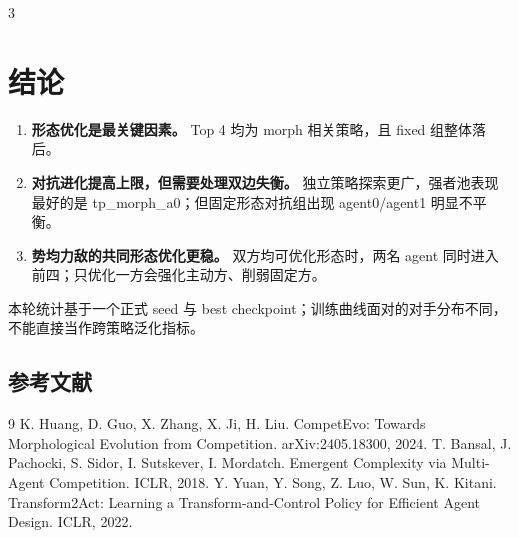 \documentclass[final]{beamer}
\newcommand{\agent}[1]{{\ttfamily\scriptsize #1}}
\begin{document}
\begin{frame}[t]
\begin{multicols}{3}
\section{结论}

\begin{enumerate}
  \item \textbf{形态优化是最关键因素。} Top 4 均为 morph 相关策略，且 fixed 组整体落后。
  \item \textbf{对抗进化提高上限，但需要处理双边失衡。} 独立策略探索更广，强者池表现最好的是 \agent{tp\_morph\_a0}；但固定形态对抗组出现 agent0/agent1 明显不平衡。
  \item \textbf{势均力敌的共同形态优化更稳。} 双方均可优化形态时，两名 agent 同时进入前四；只优化一方会强化主动方、削弱固定方。
\end{enumerate}

 本轮统计基于一个正式 seed 与 best checkpoint；训练曲线面对的对手分布不同，不能直接当作跨策略泛化指标。

\subsection{参考文献}
\begin{thebibliography}{9}
K. Huang, D. Guo, X. Zhang, X. Ji, H. Liu.
\newblock CompetEvo: Towards Morphological Evolution from Competition.
\newblock arXiv:2405.18300, 2024.
T. Bansal, J. Pachocki, S. Sidor, I. Sutskever, I. Mordatch.
\newblock Emergent Complexity via Multi-Agent Competition.
\newblock ICLR, 2018.
Y. Yuan, Y. Song, Z. Luo, W. Sun, K. Kitani.
\newblock Transform2Act: Learning a Transform-and-Control Policy for Efficient Agent Design.
\newblock ICLR, 2022.
\end{thebibliography}

\end{multicols}
\end{frame}
\end{document}
